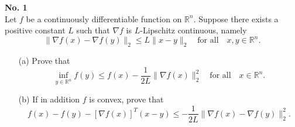 \documentclass[a4paper, 11pt]{article}
\newenvironment{problem}[2][No.]
    { \begin{mdframed}[backgroundcolor=gray!5] \textbf{#1 #2} \\}
    {  \end{mdframed}}
\begin{document}
\noindent

\begin{problem}{1}
	Let \( f \) be a continuously differentiable function on \( \mathbb{R}^n \). Suppose there exists a positive constant \( L \) such that \( \nabla f \) is \( L \)-Lipschitz continuous, namely
$$
	\|\nabla f(x) - \nabla f(y)\|_2 \leq L\|x - y\|_2 \quad \text{for all} \quad x, y \in \mathbb{R}^n.
$$
	\begin{enumerate}
		\item[(a)] Prove that
$$
		\inf_{y \in \mathbb{R}^n} f(y) \leq f(x) - \frac{1}{2L}\|\nabla f(x)\|_2^2 \quad \text{for all} \quad x \in \mathbb{R}^n.
$$
		\item[(b)] If in addition \( f \) is convex, prove that
$$
		f(x) - f(y) - [\nabla f(x)]^T(x - y) \leq -\frac{1}{2L}\|\nabla f(x) - \nabla f(y)\|_2^2.
$$
	\end{enumerate}
\end{problem}
\end{document}
